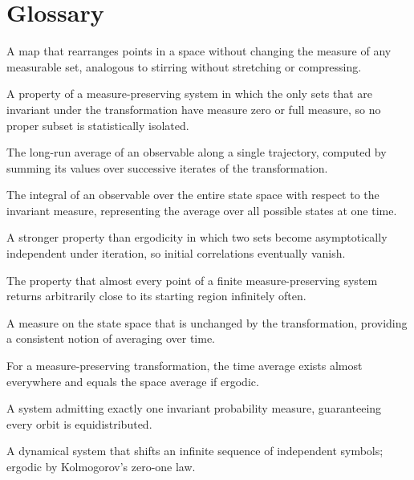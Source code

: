 \theoryapplications
{}
\section*{Glossary}
\begin{description}[leftmargin=*,style=nextline,itemsep=0.3em]
\item[\textbf{Measure-preserving transformation.}] A map that rearranges points in a space without changing the measure of any measurable set, analogous to stirring without stretching or compressing.
\item[\textbf{Ergodic.}] A property of a measure-preserving system in which the only sets that are invariant under the transformation have measure zero or full measure, so no proper subset is statistically isolated.
\item[\textbf{Time average.}] The long-run average of an observable along a single trajectory, computed by summing its values over successive iterates of the transformation.
\item[\textbf{Space average.}] The integral of an observable over the entire state space with respect to the invariant measure, representing the average over all possible states at one time.
\item[\textbf{Mixing.}] A stronger property than ergodicity in which two sets become asymptotically independent under iteration, so initial correlations eventually vanish.
\item[\textbf{Recurrence.}] The property that almost every point of a finite measure-preserving system returns arbitrarily close to its starting region infinitely often.
\item[\textbf{Invariant measure.}] A measure on the state space that is unchanged by the transformation, providing a consistent notion of averaging over time.
\item[\textbf{Birkhoff ergodic theorem.}] For a measure-preserving transformation, the time average exists almost everywhere and equals the space average if ergodic.
\item[\textbf{Uniquely ergodic.}] A system admitting exactly one invariant probability measure, guaranteeing every orbit is equidistributed.
\item[\textbf{Bernoulli shift.}] A dynamical system that shifts an infinite sequence of independent symbols; ergodic by Kolmogorov's zero-one law.
\end{description}

